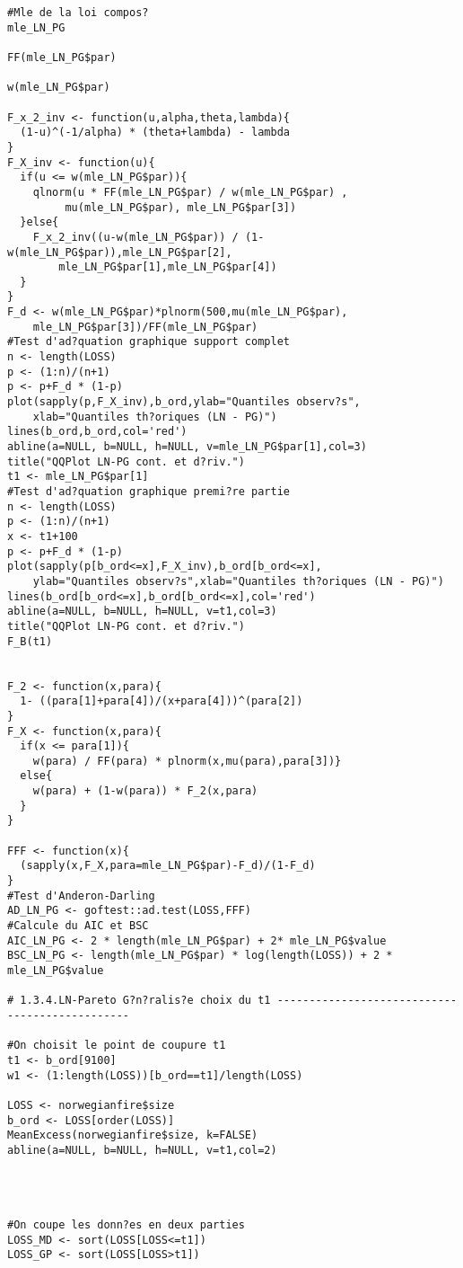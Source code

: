 \begin{verbatim}
#Mle de la loi compos?
mle_LN_PG

FF(mle_LN_PG$par)

w(mle_LN_PG$par)

F_x_2_inv <- function(u,alpha,theta,lambda){
  (1-u)^(-1/alpha) * (theta+lambda) - lambda
}
F_X_inv <- function(u){
  if(u <= w(mle_LN_PG$par)){
    qlnorm(u * FF(mle_LN_PG$par) / w(mle_LN_PG$par) ,
    	 mu(mle_LN_PG$par), mle_LN_PG$par[3])
  }else{
    F_x_2_inv((u-w(mle_LN_PG$par)) / (1-w(mle_LN_PG$par)),mle_LN_PG$par[2],
    	mle_LN_PG$par[1],mle_LN_PG$par[4])
  }
}
F_d <- w(mle_LN_PG$par)*plnorm(500,mu(mle_LN_PG$par),
	mle_LN_PG$par[3])/FF(mle_LN_PG$par)
#Test d'ad?quation graphique support complet
n <- length(LOSS)
p <- (1:n)/(n+1)
p <- p+F_d * (1-p)
plot(sapply(p,F_X_inv),b_ord,ylab="Quantiles observ?s",
	xlab="Quantiles th?oriques (LN - PG)")
lines(b_ord,b_ord,col='red')
abline(a=NULL, b=NULL, h=NULL, v=mle_LN_PG$par[1],col=3)
title("QQPlot LN-PG cont. et d?riv.")
t1 <- mle_LN_PG$par[1]
#Test d'ad?quation graphique premi?re partie
n <- length(LOSS)
p <- (1:n)/(n+1)
x <- t1+100
p <- p+F_d * (1-p)
plot(sapply(p[b_ord<=x],F_X_inv),b_ord[b_ord<=x],
	ylab="Quantiles observ?s",xlab="Quantiles th?oriques (LN - PG)")
lines(b_ord[b_ord<=x],b_ord[b_ord<=x],col='red')
abline(a=NULL, b=NULL, h=NULL, v=t1,col=3)
title("QQPlot LN-PG cont. et d?riv.")
F_B(t1)


F_2 <- function(x,para){
  1- ((para[1]+para[4])/(x+para[4]))^(para[2])
}
F_X <- function(x,para){
  if(x <= para[1]){
    w(para) / FF(para) * plnorm(x,mu(para),para[3])}
  else{
    w(para) + (1-w(para)) * F_2(x,para)
  }
}

FFF <- function(x){
  (sapply(x,F_X,para=mle_LN_PG$par)-F_d)/(1-F_d)
}
#Test d'Anderon-Darling
AD_LN_PG <- goftest::ad.test(LOSS,FFF)
#Calcule du AIC et BSC
AIC_LN_PG <- 2 * length(mle_LN_PG$par) + 2* mle_LN_PG$value 
BSC_LN_PG <- length(mle_LN_PG$par) * log(length(LOSS)) + 2 * mle_LN_PG$value

# 1.3.4.LN-Pareto G?n?ralis?e choix du t1 -----------------------------------------------

#On choisit le point de coupure t1
t1 <- b_ord[9100]
w1 <- (1:length(LOSS))[b_ord==t1]/length(LOSS)

LOSS <- norwegianfire$size
b_ord <- LOSS[order(LOSS)]
MeanExcess(norwegianfire$size, k=FALSE)
abline(a=NULL, b=NULL, h=NULL, v=t1,col=2)




#On coupe les donn?es en deux parties
LOSS_MD <- sort(LOSS[LOSS<=t1])
LOSS_GP <- sort(LOSS[LOSS>t1])



\end{verbatim}
